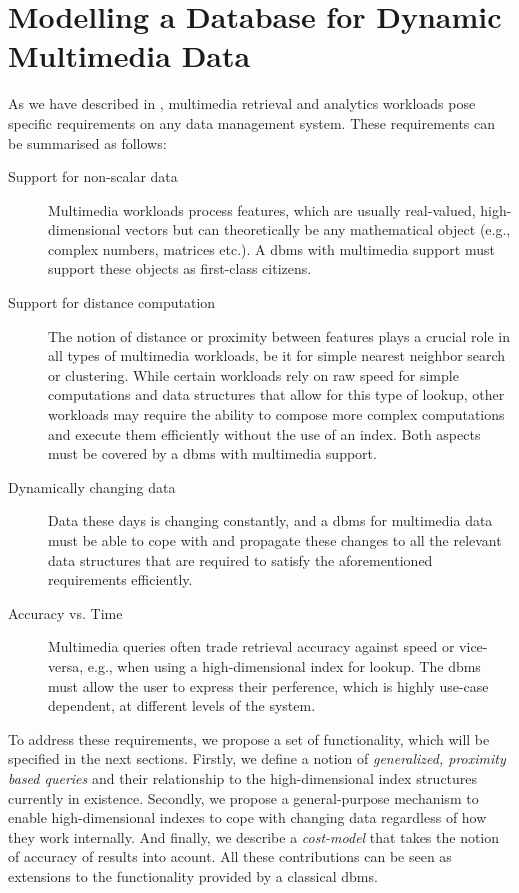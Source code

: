 \chapter{Modelling a Database for Dynamic Multimedia Data}
\label{chapter:system_model}

As we have described in , multimedia retrieval and analytics workloads pose specific requirements on any data management system. These requirements can be summarised as follows:

\begin{description}
    \item[Support for non-scalar data] Multimedia workloads process features, which are usually real-valued, high-dimensional vectors but can theoretically be any mathematical object (e.g., complex numbers, matrices etc.). A \acrshort{dbms} with multimedia support must support these objects as first-class citizens.
    \item[Support for distance computation] The notion of distance or proximity between features plays a crucial role in all types of multimedia workloads, be it for simple nearest neighbor search or clustering. While certain workloads rely on raw speed for simple computations and data structures that allow for this type of lookup, other workloads may require the ability to compose more complex computations and execute them efficiently without the use of an index. Both aspects must be covered by a \acrshort{dbms} with multimedia support.
    \item[Dynamically changing data] Data these days is changing constantly, and a \acrshort{dbms} for multimedia data must be able to cope with and propagate these changes to all the relevant data structures that are required to satisfy the aforementioned requirements efficiently.
    \item[Accuracy vs. Time] Multimedia queries often trade retrieval accuracy against speed or vice-versa, e.g., when using a high-dimensional index for lookup. The \acrshort{dbms} must allow the user to express their perference, which is highly use-case dependent, at different levels of the system.
\end{description}

To address these requirements, we propose a set of functionality, which will be specified in the next sections. Firstly, we define a notion of \emph{generalized, proximity based queries} and their relationship to the high-dimensional index structures currently in existence. Secondly, we propose a general-purpose mechanism to enable high-dimensional indexes to cope with changing data regardless of how they work internally. And finally, we describe a \emph{cost-model} that takes the notion of accuracy of results into acount. All these contributions can be seen as extensions to the functionality provided by a classical \acrshort{dbms}.

